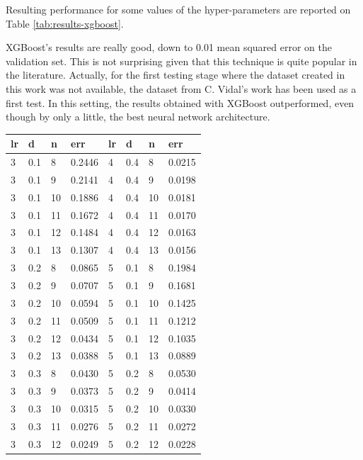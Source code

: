Resulting performance for some values of the hyper-parameters are reported on Table \ref{tab:results-xgboost}.

XGBoost's results are really good, down to 0.01 mean squared error on the validation set. This is not surprising given that this technique is quite popular in the literature. Actually, for the first testing stage where the dataset created in this work was not available, the dataset from C. Vidal's work has been used as a first test. In this setting, the results obtained with XGBoost outperformed, even though by only a little, the best neural network architecture.

\begin{table}[h!]
    \centering
    \begin{tabular}{|l|l|l|l||l|l|l|l|}
        \hline
        lr & d & n & err & lr & d & n & err \\ \hline
        3 & 0.1 &  8  & 0.2446 & 4 & 0.4 &  8  & 0.0215 \\
        3 & 0.1 &  9  & 0.2141 & 4 & 0.4 &  9  & 0.0198 \\
        3 & 0.1 &  10 & 0.1886 & 4 & 0.4 &  10 & 0.0181 \\
        3 & 0.1 &  11 & 0.1672 & 4 & 0.4 &  11 & 0.0170 \\
        3 & 0.1 &  12 & 0.1484 & 4 & 0.4 &  12 & 0.0163 \\
        3 & 0.1 &  13 & 0.1307 & 4 & 0.4 &  13 & 0.0156 \\
        3 & 0.2 &  8  & 0.0865 & 5 & 0.1 &  8  & 0.1984 \\
        3 & 0.2 &  9  & 0.0707 & 5 & 0.1 &  9  & 0.1681 \\
        3 & 0.2 &  10 & 0.0594 & 5 & 0.1 &  10 & 0.1425 \\
        3 & 0.2 &  11 & 0.0509 & 5 & 0.1 &  11 & 0.1212 \\
        3 & 0.2 &  12 & 0.0434 & 5 & 0.1 &  12 & 0.1035 \\
        3 & 0.2 &  13 & 0.0388 & 5 & 0.1 &  13 & 0.0889 \\
        3 & 0.3 &  8  & 0.0430 & 5 & 0.2 &  8  & 0.0530 \\
        3 & 0.3 &  9  & 0.0373 & 5 & 0.2 &  9  & 0.0414 \\
        3 & 0.3 &  10 & 0.0315 & 5 & 0.2 &  10 & 0.0330 \\
        3 & 0.3 &  11 & 0.0276 & 5 & 0.2 &  11 & 0.0272 \\
        3 & 0.3 &  12 & 0.0249 & 5 & 0.2 &  12 & 0.0228 \\

\end{tabular}
\end{table}
